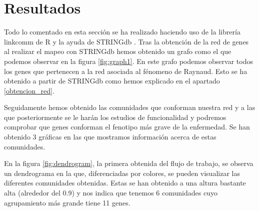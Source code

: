 \section{Resultados}
\label{resultados}
\begin{spacing}{1}
Todo lo comentado en esta sección se ha realizado haciendo uso de la librería linkcomm de R y la ayuda de STRINGdb \cite{HelpNetworks} . 
Tras la obtención de la red de genes al realizar el mapeo con STRINGdb hemos obtenido un grafo como el que podemos observar en la figura \ref{fig:graph1}. En este grafo podemos observar todos los genes que pertenecen a la red asociada al fénomeno de Raynaud. Esto se ha obtenido a partir de STRINGdb como hemos explicado en el apartado \ref{obtencion_red}.
\end{spacing}

\begin{minipage}{\linewidth}
	\label{fig:graph1}
\end{minipage}

\begin{spacing}{1}
	Seguidamente hemos obtenido las comunidades que conforman nuestra red y a las que posteriormente se le harán los estudios de funcionalidad y podremos comprobar que genes conforman el fenotipo más grave de la enfermedad. Se han obtenido 3 gráficas en las que mostramos información acerca de estas comunidades.
	
	En la figura \ref{fig:dendrogram}, la primera obtenida del flujo de trabajo, se observa un dendrograma en la que, diferenciadas por colores, se pueden visualizar las diferentes comunidades obtenidas. Estas se han obtenido a una altura bastante alta (alrededor del 0.9) y nos indica que tenemos 6 comunidades cuyo agrupamiento más grande tiene 11 genes.
\end{spacing}

